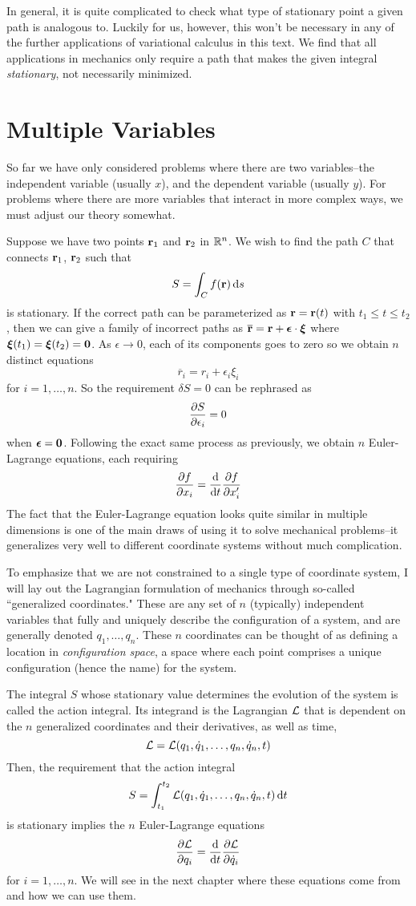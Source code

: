 In general, it is quite complicated to check what type of stationary point a given path is analogous to. Luckily for us, however, this won't be necessary in any of the further applications of variational calculus in this text. We find that all applications in mechanics only require a path that makes the given integral \textit{stationary}, not necessarily minimized. 
\section{Multiple Variables}
So far we have only considered problems where there are two variables--the independent variable (usually $x$), and the dependent variable (usually $y$). For problems where there are more variables that interact in more complex ways, we must adjust our theory somewhat.

Suppose we have two points $\mathbf{r}_1$ and $\mathbf{r}_2$ in $\mathbb{R}^n$. We wish to find the path $C$ that connects $\mathbf{r}_1$, $\mathbf{r}_2$ such that
\[ S = \int_C f(\mathbf{r}) \, \dd s\]
is stationary. If the correct path can be parameterized as $\mathbf{r} = \mathbf{r}(t)$ with $t_1 \leq t \leq t_2$, then we can give a family of incorrect paths as $\overline{\mathbf{r}} = \mathbf{r} + \boldsymbol \epsilon\cdot  \boldsymbol\xi$ where $\boldsymbol\xi(t_1)=\boldsymbol\xi(t_2)=\mathbf{0}$. As $\epsilon \to 0$, each of its components goes to zero so we obtain $n$ distinct equations
\[ \overline r_i = r_i + \epsilon_i \xi_i \]
for $i = 1, \dots, n$. So the requirement $\delta S = 0$ can be rephrased as
\[ \pdv{S}{\epsilon_i} = 0\]
when $\boldsymbol \epsilon = \mathbf{0}$. Following the exact same process as previously, we obtain $n$ Euler-Lagrange equations, each requiring
\[ \pdv{f}{x_i} = \dv{t} \pdv{f}{x'_i}\]
The fact that the Euler-Lagrange equation looks quite similar in multiple dimensions is one of the main draws of using it to solve mechanical problems--it generalizes very well to different coordinate systems without much complication. 

To emphasize that we are not constrained to a single type of coordinate system, I will lay out the Lagrangian formulation of mechanics through so-called ``generalized coordinates." These are any set of $n$ (typically) independent variables that fully and uniquely describe the configuration of a system, and are generally denoted $q_1, \dots, q_n$. These $n$ coordinates can be thought of as defining a location in \textit{configuration space}, a space where each point comprises a unique configuration (hence the name) for the system. 

The integral $S$ whose stationary value determines the evolution of the system is called the action integral. Its integrand is the Lagrangian $\mathcal{L}$ that is dependent on the $n$ generalized coordinates and their derivatives, as well as time,
\[ \mathcal{L} = \mathcal{L}(q_1, \dot q_1, \dots, q_n, \dot q_n, t) \]
Then, the requirement that the action integral 
\[ S = \int_{t_1}^{t_2}\mathcal{L}(q_1, \dot q_1, \dots, q_n, \dot q_n, t)\, \dd t \]
is stationary implies the $n$ Euler-Lagrange equations
\[ \pdv{\mathcal{L}}{q_i} = \dv{t} \pdv{\mathcal{L}}{\dot q_i}\]
for $i = 1, \dots, n$. We will see in the next chapter where these equations come from and how we can use them. 